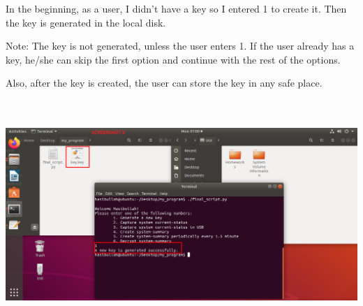 \documentclass{article} %
\begin{document}
\noindent 

\noindent 

\noindent 

\noindent 

\noindent 

\noindent 

\noindent 

\noindent 

\noindent 

\noindent 

\noindent 

\noindent 

\noindent \newline\newline \newline\newline\newline \newline\newline\newline \newline\newline\newline \newline\newline\newline\newline \newline\newline\newline\newline  In the beginning, as a user, I didn't have a key so I entered 1 to create it. Then the key is generated in the local disk.\newline

\noindent Note: The key is not generated, unless the user enters 1. If the user already has a key, he/she can skip the first option and continue with the rest of the options.\newline

\noindent Also, after the key is created, the user can store the key in any safe place.\newline   
\includegraphics*[width=6in, height=3.70in, keepaspectratio=false]{2.png}
\end{document}
